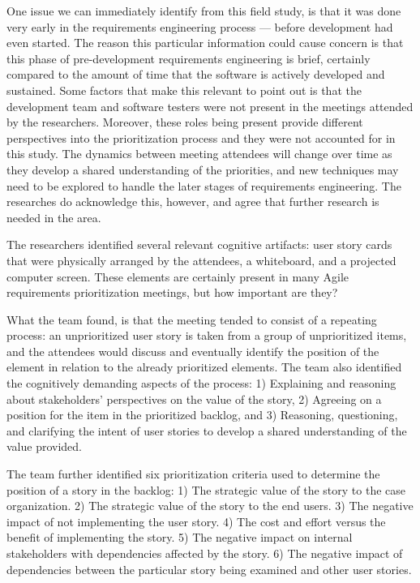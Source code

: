 One issue we can immediately identify from this field study, is that it was done very early in the requirements engineering process --- before development had even started. The reason this particular information could cause concern is that this phase of pre-development requirements engineering is brief, certainly compared to the amount of time that the software is actively developed and sustained. Some factors that make this relevant to point out is that the development team and software testers were not present in the meetings attended by the researchers. Moreover, these roles being present provide different perspectives into the prioritization process and they were not accounted for in this study. The dynamics between meeting attendees will change over time as they develop a shared understanding of the priorities, and new techniques may need to be explored to handle the later stages of requirements engineering. The researches do acknowledge this, however, and agree that further research is needed in the area.

The researchers identified several relevant cognitive artifacts: user story cards that were physically arranged by the attendees, a whiteboard, and a projected computer screen. These elements are certainly present in many Agile requirements prioritization meetings, but how important are they?

What the team found, is that the meeting tended to consist of a repeating process: an unprioritized user story is taken from a group of unprioritized items, and the attendees would discuss and eventually identify the position of the element in relation to the already prioritized elements. The team also identified the cognitively demanding aspects of the process: 1) Explaining and reasoning about stakeholders' perspectives on the value of the story, 2) Agreeing on a position for the item in the prioritized backlog, and 3) Reasoning, questioning, and clarifying the intent of user stories to develop a shared understanding of the value provided.\cite{buchan2020applying}

The team further identified six prioritization criteria used to determine the position of a story in the backlog: 1) The strategic value of the story to the case organization. 2) The strategic value of the story to the end users. 3) The negative impact of not implementing the user story. 4) The cost and effort versus the benefit of implementing the story. 5) The negative impact on internal stakeholders with dependencies affected by the story. 6) The negative impact of dependencies between the particular story being examined and other user stories.\cite{buchan2020applying}

